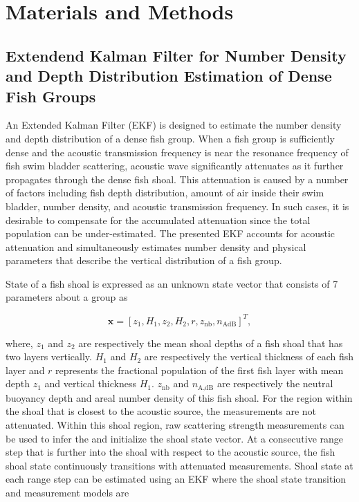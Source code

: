 \documentclass[technicalnote,oneauthor,latex,dvi2pdf,10pt,a4paper]{Definitions/mdpi}
\begin{document}


\section{Materials and Methods}
\subsection{Extendend Kalman Filter for Number Density and Depth Distribution Estimation of Dense Fish Groups}
An Extended Kalman Filter (EKF) is designed to estimate the number density and depth distribution of a dense fish group.
When a fish group is sufficiently dense and the acoustic transmission frequency is near the resonance frequency of fish swim bladder scattering, acoustic wave significantly attenuates as it further propagates through the dense fish shoal. 
This attenuation is caused by a number of factors including fish depth distribution, amount of air inside their swim bladder, number density, and acoustic transmission frequency.
In such cases, it is desirable to compensate for the accumulated attenuation since the total population can be under-estimated.
The presented EKF accounts for acoustic attenuation and simultaneously estimates number density and physical parameters that describe the vertical distribution of a fish group.

State of a fish shoal is expressed as an unknown state vector that consists of 7 parameters about a group as

\begin{equation}
\label{eq:stateVec}
\mathbf{x} = \left[z_1, H_1, z_2, H_2, r, z_\text{nb}, n_\text{AdB}\right]^{T},
\end{equation}

\noindent where, $z_1$ and $z_2$ are respectively the mean shoal depths of a fish shoal that has two layers vertically. 
$H_1$ and $H_2$ are respectively the vertical thickness of each fish layer and $r$ represents the fractional population of the first fish layer with mean depth $z_1$ and vertical thickness $H_1$.
$z_\text{nb}$ and $n_\text{A,dB}$ are respectively the neutral buoyancy depth and areal number density of this fish shoal.
For the region within the shoal that is closest to the acoustic source, the measurements are not attenuated. 
Within this shoal region, raw scattering strength measurements can be used to infer the and initialize the shoal state vector.
At a consecutive range step that is further into the shoal with respect to the acoustic source, the fish shoal state continuously transitions with attenuated measurements.
Shoal state at each range step can be estimated using an EKF where the shoal state transition and measurement models are 
\end{document}
